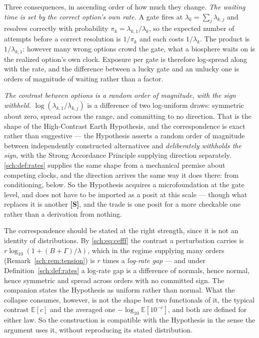 \documentclass[11pt]{article}
\numberwithin{equation}{section}
\theoremstyle{plain}
\theoremstyle{definition}
\theoremstyle{remark}
\newcommand{\E}{\mathbb{E}}
\begin{document}
Three consequences, in ascending order of how much they change. \emph{The waiting time is set by the correct option's own rate.} A gate
fires at $\lambda_k=\sum_j\lambda_{k,j}$ and resolves correctly with
probability $\pi_k=\lambda_{k,1}/\lambda_k$, so the expected number of
attempts before a correct resolution is $1/\pi_k$ and each costs
$1/\lambda_k$. The product is $1/\lambda_{k,1}$: however many wrong
options crowd the gate, what a biosphere waits on is the realized
option's own clock. Exposure per gate is therefore log-spread along with
the rate, and the difference between a lucky gate and an unlucky one is
orders of magnitude of waiting rather than a factor.

\emph{The contrast between options is a random order of magnitude, with
the sign withheld.} $\log(\lambda_{k,1}/\lambda_{k,j})$ is a difference
of two log-uniform draws: symmetric about zero, spread across the range,
and committing to no direction. That is the shape of the High-Contrast
Earth Hypothesis, and the correspondence is exact rather than
suggestive --- the Hypothesis asserts a random order of magnitude between
independently constructed alternatives and \emph{deliberately withholds
the sign}, with the Strong Accordance Principle supplying direction
separately. \eqref{sch:def:rates} supplies the same shape from a
mechanical premise about competing clocks, and the direction arrives the
same way it does there: from conditioning, below. So the Hypothesis
acquires a microfoundation at the gate level, and does not have to be
imported as a posit at this scale --- though what replaces it is another
\textbf{[S]}, and the trade is one posit for a more checkable one rather
than a derivation from nothing.

The correspondence should be stated at the right strength, since it is
not an identity of distributions. By \eqref{sch:eq:cefff} the contrast a
perturbation carries is $r\log_{10}(1+(B+\Gamma)/\lambda)$, which in the
regime supplying many orders (Remark~\ref{sch:rem:tension}) is $r$ times
a \emph{log-rate gap} --- and under Definition~\ref{sch:def:rates} a
log-rate gap is a difference of normals, hence normal, hence symmetric
and spread across orders with no committed sign. The companion states
the Hypothesis as uniform rather than normal. What the collapse
consumes, however, is not the shape but two functionals of it, the
typical contrast $\E[c]$ and the averaged one
$-\log_{10}\E[10^{-c}]$, and both are defined for either law. So the
construction is compatible with the Hypothesis in the sense the argument
uses it, without reproducing its stated distribution.
\end{document}
